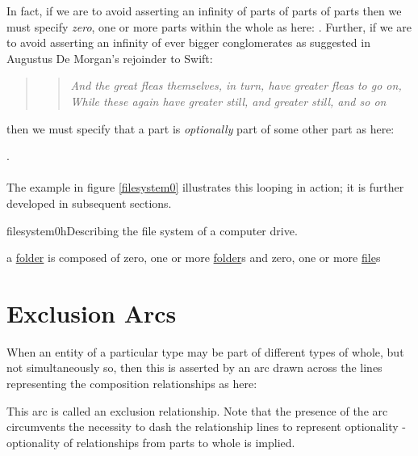 \vspace{0.2cm}
\noindent In fact, if we are to avoid asserting an infinity of parts of parts of parts then we 
must specify \textit{zero}, one or more parts within the whole as here:
\raisebox{-0.7cm}{
\raisebox{0.7cm}{(h)}

}. Further, if we are to avoid asserting an infinity of ever bigger conglomerates as suggested in Augustus De Morgan's rejoinder to Swift:
\begin{quote}
\begin{verse}
\textit{And the great fleas themselves, in turn, have greater fleas to go on,\\
While these again have greater still, and greater still, and so on\\
}
\end{verse}
\end{quote}

\noindent then we must specify that a part is \emph{optionally} part of some other part as here:

\raisebox{-0.7cm}{
\raisebox{0.7cm}{(i)}

}.
\\
\\
\noindent The example in figure \ref{filesystem0} illustrates this looping in action; it is further developed in subsequent sections. 

\begin{erbulletedFig}{filesystem0}{h}{Describing the file system of a computer drive.}

\item{a \underline{folder} is composed of zero, one or more \underline{folder}s 
and zero, one or more \underline{file}s}
\end{erbulletedFig}

\section{Exclusion Arcs}

\noindent When an entity of a particular type may be part of different types of whole, but not simultaneously so, then this is asserted by an arc drawn across the lines representing the composition relationships as here:
\begin{center}
\raisebox{-1cm}{
\raisebox{1cm}{(j)}

}
\end{center}

\noindent This arc is called an exclusion relationship. Note that the presence of the arc circumvents the necessity to dash the relationship lines to represent optionality - optionality of relationships from parts to whole is implied. \\


